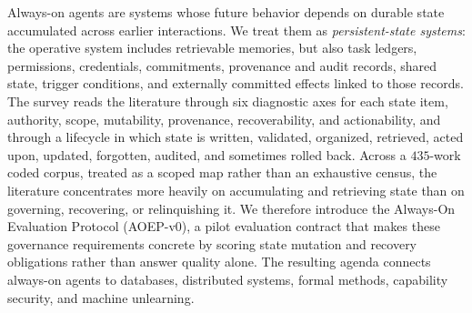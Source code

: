 Always-on agents are systems whose future behavior depends on durable state
accumulated across earlier interactions. We treat them as
\emph{persistent-state systems}: the operative system includes retrievable
memories, but also task ledgers, permissions, credentials, commitments,
provenance and audit records, shared state, trigger conditions, and externally
committed effects linked to those records. The survey reads the literature through six diagnostic axes for
each state item, authority, scope, mutability, provenance, recoverability, and
actionability, and through a lifecycle in which state is written, validated,
organized, retrieved, acted upon, updated, forgotten, audited, and sometimes
rolled back. Across a $435$-work coded corpus, treated as a scoped map rather
than an exhaustive census, the literature concentrates more heavily on
accumulating and retrieving state than on governing, recovering, or
relinquishing it. We therefore introduce the Always-On Evaluation Protocol
(AOEP-v0), a pilot evaluation contract that makes these governance requirements
concrete by scoring state mutation and recovery obligations rather than answer
quality alone. The resulting agenda connects always-on agents to databases,
distributed systems, formal methods, capability security, and machine
unlearning.
